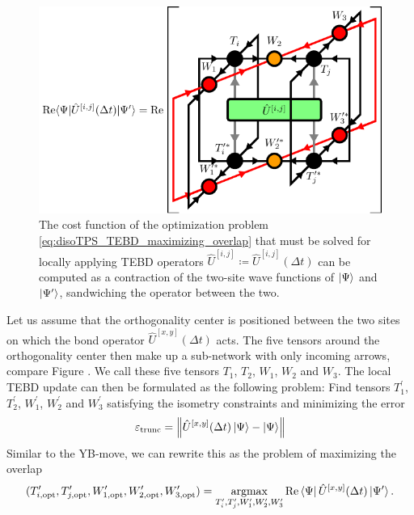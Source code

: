 \begin{figure}
	\centering
	\includegraphics[scale=1]{figures/tikz/disoTPS/tebd_environment/tebd_environment.pdf}
	\caption{The cost function of the optimization problem \eqref{eq:disoTPS_TEBD_maximizing_overlap} that must be solved for locally applying TEBD operators $\hat{U}^{[i,j]} \coloneqq \hat{U}^{[i,j]}(\Delta t)$ can be computed as a contraction of the two-site wave functions of $\ket{\Psi}$ and $\ket{\Psi^\prime}$, sandwiching the operator between the two.}
	\label{fig:disoTPS_TEBD_overlap_contraction}
\end{figure}
Let us assume that the orthogonality center is positioned between the two sites on which the bond operator $\hat{U}^{[x, y]}\left(\Delta t\right)$ acts. The five tensors around the orthogonality center then make up a sub-network with only incoming arrows, compare Figure . We call these five tensors $T_1$, $T_2$, $W_1$, $W_2$ and $W_3$. The local TEBD update can then be formulated as the following problem: Find tensors $T_1^\prime$, $T_2^\prime$, $W_1^\prime$, $W_2^\prime$ and $W_3^\prime$ satisfying the isometry constraints and minimizing the error
\begin{equation}
	\label{eq:isoDTPS_TEBD_local_update_error}
	\varepsilon_\text{trunc} = \left\lVert \hat{U}^{[x,y]}(\Delta t)\ket{\Psi} - \ket{\Psi}\right\rVert
\end{equation}
Similar to the YB-move, we can rewrite this as the problem of maximizing the overlap
\begin{equation}
	\label{eq:disoTPS_TEBD_maximizing_overlap}
	(T_{i,\text{opt}}^\prime, T_{j,\text{opt}}^\prime, W_{1,\text{opt}}^\prime, W_{2,\text{opt}}^\prime, W_{3,\text{opt}}^\prime)= \underset{T_i^\prime, T_j^\prime, W_1^\prime, W_2^\prime, W_3^\prime}{\operatorname{argmax}}\operatorname{Re}\bra{\Psi}\hat{U}^{[x,y]}(\Delta t)\ket{\Psi^\prime}.
\end{equation}
